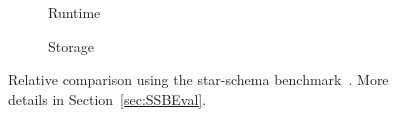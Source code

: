 \begin{figure}[t]
	{
		\footnotesize
		\graphicspath{{results/ssb/}}
		\null
		\begin{subfigure}[t]{1in}
			
			\caption{Runtime}
			\label{fig:teaser:runtime}%
		\end{subfigure}
		\hfill
		\begin{subfigure}[t]{1in}
			
			\caption{Storage}
			\label{fig:teaser:memory}%
		\end{subfigure}
		\hfill
		\begin{subfigure}[t]{0.8in}
			
		\end{subfigure}
		\null
	}
	\vspace{-0.2cm}
\caption{Relative comparison using the star-schema benchmark~\cite{DBLP:journals/corr/Sanchez16a}. More details in Section~\ref{sec:SSBEval}.}
	\label{fig:teaser}
	\vspace{-0.5cm}
\end{figure}

